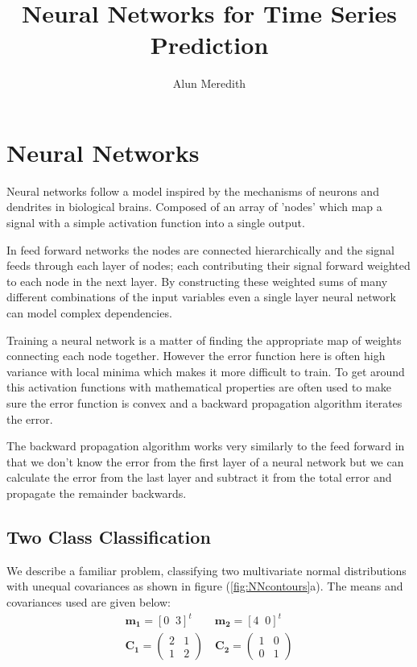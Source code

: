\documentclass[a4paper,10pt, twocolumn]{article}
\begin{document}
\title{Neural Networks for Time Series Prediction}
\author{Alun Meredith}
\maketitle

\begin{abstract}

\end{abstract}
\section{Neural Networks}
Neural networks follow a model inspired by the mechanisms of neurons and dendrites in biological brains. Composed of an array of 'nodes' which map a signal with a simple activation function into a single output.

In feed forward networks the nodes are connected hierarchically and the signal feeds through each layer of nodes; each contributing their signal forward weighted to each node in the next layer. By constructing these weighted sums of many different combinations of the input variables even a single layer neural network can model complex dependencies.  

Training a neural network is a matter of finding the appropriate map of weights connecting each node together. However the error function here is often high variance with local minima which makes it more difficult to train. To get around this activation functions with mathematical properties are often used to make sure the error function is convex and a backward propagation algorithm iterates the error. 

The backward propagation algorithm works very similarly to the feed forward in that we don't know the error from the first layer of a neural network but we can calculate the error from the last layer and subtract it from the total error and propagate the remainder backwards. 

\subsection{Two Class Classification}
We describe a familiar problem, classifying two multivariate normal distributions with unequal covariances as shown in figure (\ref{fig:NNcontours}a). The means and covariances used are given below:
\begin{align}
	\mathbf{m_1} = [0 \;\; 3]^t \qquad \mathbf{m_2} = [4 \;\; 0]^t \\
	\mathbf{C_1} = 
	\begin{pmatrix}
	2 & 1 \\
	1 & 2
	\end{pmatrix} \quad
	\mathbf{C_2} = 
	\begin{pmatrix}
	1 & 0 \\
	0 & 1
	\end{pmatrix}	
\end{align}
\end{document}
